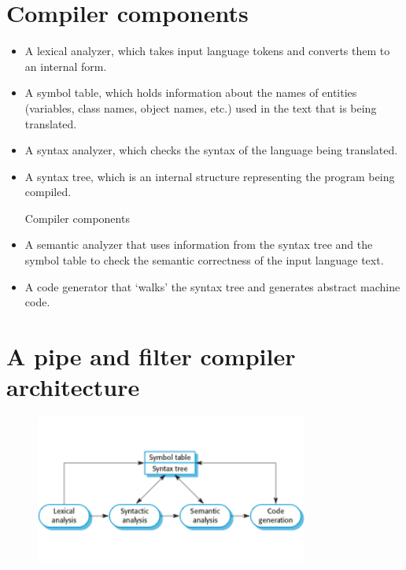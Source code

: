 \section{Compiler components}
\begin{itemize}
\item A lexical analyzer, which takes input language tokens and converts them to an internal form.

\item A symbol table, which holds information about the names of entities (variables, class names, object names, etc.) used in the text that is being translated.

\item A syntax analyzer, which checks the syntax of the language being translated.

\item A syntax tree, which is an internal structure representing the program being compiled.

Compiler components

\item A semantic analyzer that uses information from the syntax tree and the symbol table to check the semantic correctness of the input language text.

\item A code generator that ‘walks’ the syntax tree and generates abstract machine code.

\end{itemize}
\section{A pipe and filter compiler architecture}
\begin{figure}[h!]
    \centering
    \includegraphics[width = 0.8\textwidth]{./figures/L3_14.png}
    \caption{}
    \label{fig:L3_14}
\end{figure}

\newpage
